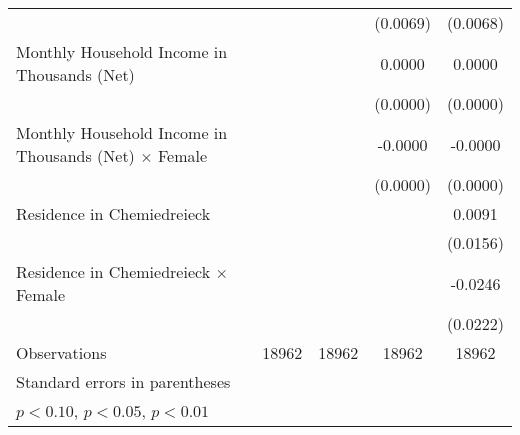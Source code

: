 {\begin{tabular}{l*{4}{c}}
                    &                     &                     &    (0.0069)         &    (0.0068)         \\
\addlinespace
Monthly Household Income in Thousands (Net)&                     &                     &      0.0000\sym{***}&      0.0000\sym{***}\\
                    &                     &                     &    (0.0000)         &    (0.0000)         \\
\addlinespace
Monthly Household Income in Thousands (Net) $\times$ Female&                     &                     &     -0.0000         &     -0.0000         \\
                    &                     &                     &    (0.0000)         &    (0.0000)         \\
\addlinespace
Residence in Chemiedreieck&                     &                     &                     &      0.0091         \\
                    &                     &                     &                     &    (0.0156)         \\
\addlinespace
Residence in Chemiedreieck $\times$ Female&                     &                     &                     &     -0.0246         \\
                    &                     &                     &                     &    (0.0222)         \\
\midrule
Observations        &       18962         &       18962         &       18962         &       18962         \\
\bottomrule
\multicolumn{5}{l}{\footnotesize Standard errors in parentheses}\\
\multicolumn{5}{l}{\footnotesize \sym{*} \(p<0.10\), \sym{**} \(p<0.05\), \sym{***} \(p<0.01\)}\\
\end{tabular}
}
